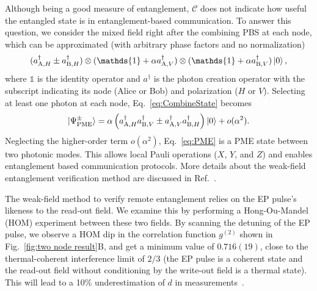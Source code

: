 \documentclass[aps,reprint,showpacs,superscriptaddress]{revtex4-2}
\begin{document}
Although being a good measure of entanglement, $\mathcal{C}$ does not indicate how useful the entangled state is in entanglement-based communication. To answer this question, we consider the mixed field right after the combining PBS at each node, which can be approximated (with arbitrary phase factors and no normalization)
\begin{equation}\label{eq:CombineState}
	(a^{\dagger}_{\textrm{A},H} \pm a^{\dagger}_{\textrm{B},H}) \otimes (\mathds{1}+\alpha a^{\dagger}_{\textrm{A},V}) \otimes (\mathds{1}+\alpha a^{\dagger}_{\textrm{B},V}) \ket{0},
\end{equation}
where $\mathds{1}$ is the identity operator and $a^{\dagger}$ is the photon creation operator with the subscript indicating its node (Alice or Bob) and polarization ($H$ or $V$). Selecting at least one photon at each node, Eq.~\ref{eq:CombineState} becomes
\begin{equation}\label{eq:PME}
	\ket{\Psi_{\textrm{PME}}^{\pm}}=\alpha\left(a^{\dagger}_{\textrm{A},H} a^{\dagger}_{\textrm{B},V} \pm a^{\dagger}_{\textrm{A},V} a^{\dagger}_{\textrm{B},H}\right)\ket{0} + o(\alpha^2).
\end{equation}
Neglecting the higher-order term $o(\alpha^2)$, Eq.~\ref{eq:PME} is a PME state between two photonic modes. This allows local Pauli operations ($X$, $Y$, and $Z$) and enables entanglement based communication protocols. More details about the weak-field entanglement verification method are discussed in Ref.~\cite{SM}.

The weak-field method to verify remote entanglement relies on the EP pulse's likeness to the read-out field. We examine this by performing a Hong-Ou-Mandel (HOM) experiment between these two fields. By scanning the detuning of the EP pulse, we observe a HOM dip in the correlation function $g^{(2)}$ shown in Fig.~\ref{fig:two node result}B, and get a minimum value of $0.716(19)$, close to the thermal-coherent interference limit of $2/3$ (the EP pulse is a coherent state and the read-out field without conditioning by the write-out field is a thermal state). This will lead to a 10\% underestimation of $d$ in measurements~\cite{SM}.
\end{document}
